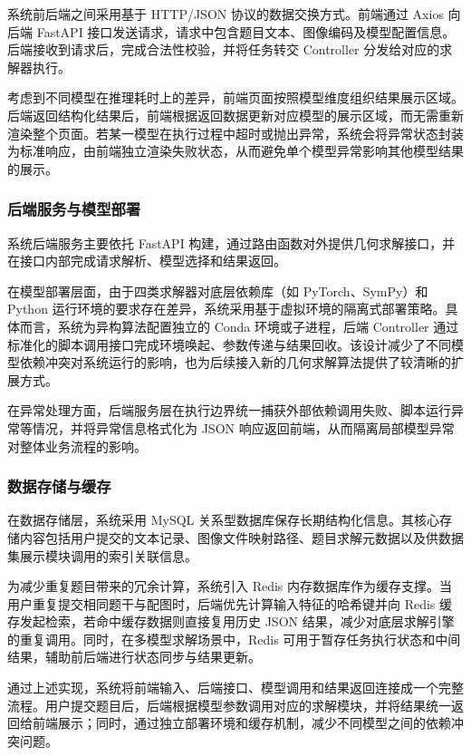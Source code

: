 系统前后端之间采用基于 HTTP/JSON 协议的数据交换方式。前端通过 Axios 向后端 FastAPI 接口发送请求，请求中包含题目文本、图像编码及模型配置信息。后端接收到请求后，完成合法性校验，并将任务转交 Controller 分发给对应的求解器执行。

考虑到不同模型在推理耗时上的差异，前端页面按照模型维度组织结果展示区域。后端返回结构化结果后，前端根据返回数据更新对应模型的展示区域，而无需重新渲染整个页面。若某一模型在执行过程中超时或抛出异常，系统会将异常状态封装为标准响应，由前端独立渲染失败状态，从而避免单个模型异常影响其他模型结果的展示。

\subsubsection{后端服务与模型部署}

系统后端服务主要依托 FastAPI 构建，通过路由函数对外提供几何求解接口，并在接口内部完成请求解析、模型选择和结果返回。

在模型部署层面，由于四类求解器对底层依赖库（如 PyTorch、SymPy）和 Python 运行环境的要求存在差异，系统采用基于虚拟环境的隔离式部署策略。具体而言，系统为异构算法配置独立的 Conda 环境或子进程，后端 Controller 通过标准化的脚本调用接口完成环境唤起、参数传递与结果回收。该设计减少了不同模型依赖冲突对系统运行的影响，也为后续接入新的几何求解算法提供了较清晰的扩展方式。

在异常处理方面，后端服务层在执行边界统一捕获外部依赖调用失败、脚本运行异常等情况，并将异常信息格式化为 JSON 响应返回前端，从而隔离局部模型异常对整体业务流程的影响。

\subsubsection{数据存储与缓存}

在数据存储层，系统采用 MySQL 关系型数据库保存长期结构化信息。其核心存储内容包括用户提交的文本记录、图像文件映射路径、题目求解元数据以及供数据集展示模块调用的索引关联信息。

为减少重复题目带来的冗余计算，系统引入 Redis 内存数据库作为缓存支撑。当用户重复提交相同题干与配图时，后端优先计算输入特征的哈希键并向 Redis 缓存发起检索，若命中缓存数据则直接复用历史 JSON 结果，减少对底层求解引擎的重复调用。同时，在多模型求解场景中，Redis 可用于暂存任务执行状态和中间结果，辅助前后端进行状态同步与结果更新。

通过上述实现，系统将前端输入、后端接口、模型调用和结果返回连接成一个完整流程。用户提交题目后，后端根据模型参数调用对应的求解模块，并将结果统一返回给前端展示；同时，通过独立部署环境和缓存机制，减少不同模型之间的依赖冲突问题。

